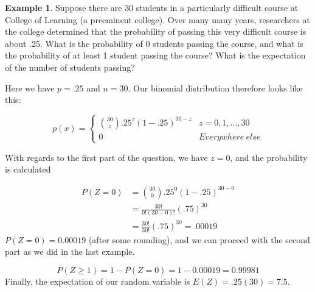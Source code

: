 \documentclass[
]{book}
\theoremstyle{definition}
\theoremstyle{definition}
\newtheorem{example}{Example}[chapter]
\theoremstyle{definition}
\theoremstyle{definition}
\theoremstyle{remark}
\begin{document}
\begin{example}
Suppose there are 30 students in a particularly difficult course at College of Learning (a preeminent college). Over many many years, researchers at the college determined that the probability of passing this very difficult course is about .25. What is the probability of 0 students passing the course, and what is the probability of at least 1 student passing the course? What is the expectation of the number of students passing?

Here we have \(p = .25\) and \(n=30\). Our binomial distribution therefore looks like this:

\[
p(x) = 
\begin{cases}
{30 \choose z} .25^z(1-.25)^{30-z} & z = 0,1,...,30 \\
0 & Everywhere\: else 
\end{cases}
\label{eq:binom}
\]

With regards to the first part of the question, we have \(z = 0\), and the probability is calculated

\begin{align}
P(Z = 0) &= {30 \choose 0} .25^0(1-.25)^{30-0} \\
&=\frac{30!}{0!(30-0)!}(.75)^{30} \\
&=\frac{30!}{30!}(.75)^{30} = .00019
\end{align}
\(P(Z=0) = 0.00019\) (after some rounding), and we can proceed with the second part as we did in the last example.

\[
P(Z \geq 1) = 1 - P(Z=0) = 1 - 0.00019 = 0.99981
\]
Finally, the expectation of our random variable is \(E(Z) = .25(30) = 7.5\).
\end{example}
\end{document}
